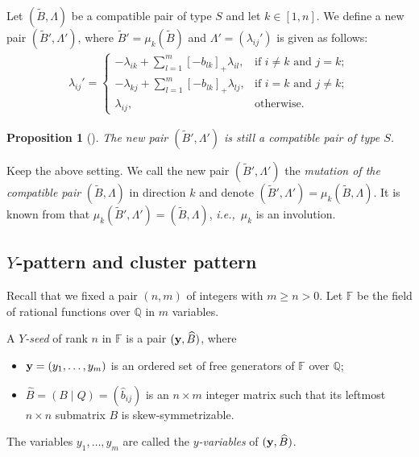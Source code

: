 \documentclass[12pt]{amsart}
\newtheorem{proposition}[theorem]{Proposition}
\theoremstyle{definition}
\theoremstyle{remark}
\numberwithin{equation}{section}
\newcommand{\ie}{\textit{i.e.,}\ }
\begin{document}
Let $(\widetilde B,\Lambda)$ be a compatible pair of type $S$ and let $k\in [1,n]$. We define 
a new pair $(\widetilde B',\Lambda')$, where $\widetilde B'=\mu_k(\widetilde B)$ and $\Lambda'=(\lambda_{ij}')$ is given as follows:
\begin{eqnarray}\label{eqn:L-mutation}
    \lambda_{ij}'=\begin{cases}-\lambda_{ik}+\sum_{l=1}^m[- b_{lk}]_+\lambda_{il},&\text{if }i\neq k\text{ and }j=k;\\
-\lambda_{kj}+\sum_{l=1}^m[- b_{lk}]_+\lambda_{lj},&\text{if }i=k \text{ and }j\neq k;\\
\lambda_{ij},&\text{otherwise}.
\end{cases}
\end{eqnarray}

\begin{proposition}[{\cite[Proposition 3.4]{bz-2005}}] \label{pro:pm} The new pair $(\widetilde B',\Lambda')$ is still a compatible pair of type $S$.
\end{proposition}
Keep the above setting. We call the new pair $(\widetilde B',\Lambda')$ the {\em mutation of the compatible pair}  $(\widetilde B,\Lambda)$ in direction $k$ and denote $(\widetilde B',\Lambda')=\mu_k(\widetilde B,\Lambda)$. It is known from \cite[Proposition 3.6]{bz-2005} that  $\mu_k(\widetilde B',\Lambda')=(\widetilde B,\Lambda)$,  \ie $\mu_k$ is an involution.







\subsection{$Y$-pattern and cluster pattern}
Recall that we fixed a pair $(n,m)$ of integers with $m\geq n >0$. Let $\mathbb F$ be the field of rational functions over $\mathbb Q$ in $m$ variables.












A {\em $Y$-seed} of rank $n$ in $\mathbb F$ is a pair $({\bf y}, \widehat B)$, where
\begin{itemize}
	\item ${\bf y} = (y_1, \ldots, y_{m})$ is an ordered set of free generators of $\mathbb F$ over $\mathbb Q$;
	\item  $\widehat B=(B\mid Q)=(\hat b_{ij})$ is an $n\times m$ integer matrix such that its leftmost $n\times n$ submatrix $B$ is skew-symmetrizable.
\end{itemize}
The variables $y_1,\ldots,y_m$ are called the {\em $y$-variables} of $({\bf y}, \widehat B)$.
\end{document}
